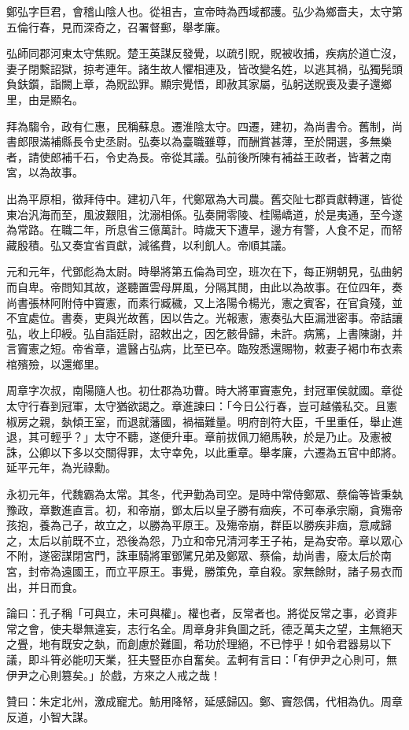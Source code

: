 \begin{pinyinscope}
鄭弘字巨君，會稽山陰人也。從祖吉，宣帝時為西域都護。弘少為鄉嗇夫，太守第五倫行春，見而深奇之，召署督郵，舉孝廉。

弘師同郡河東太守焦貺。楚王英謀反發覺，以疏引貺，貺被收捕，疾病於道亡沒，妻子閉繫詔獄，掠考連年。諸生故人懼相連及，皆改變名姓，以逃其禍，弘獨髡頭負鈇鑕，詣闕上章，為貺訟罪。顯宗覺悟，即赦其家屬，弘躬送貺喪及妻子還鄉里，由是顯名。

拜為騶令，政有仁惠，民稱蘇息。遷淮陰太守。四遷，建初，為尚書令。舊制，尚書郎限滿補縣長令史丞尉。弘奏以為臺職雖尊，而酬賞甚薄，至於開選，多無樂者，請使郎補千石，令史為長。帝從其議。弘前後所陳有補益王政者，皆著之南宮，以為故事。

出為平原相，徵拜侍中。建初八年，代鄭眾為大司農。舊交阯七郡貢獻轉運，皆從東冶汎海而至，風波艱阻，沈溺相係。弘奏開零陵、桂陽嶠道，於是夷通，至今遂為常路。在職二年，所息省三億萬計。時歲天下遭旱，邊方有警，人食不足，而帑藏殷積。弘又奏宜省貢獻，減徭費，以利飢人。帝順其議。

元和元年，代鄧彪為太尉。時舉將第五倫為司空，班次在下，每正朔朝見，弘曲躬而自卑。帝問知其故，遂聽置雲母屏風，分隔其閒，由此以為故事。在位四年，奏尚書張林阿附侍中竇憲，而素行臧穢，又上洛陽令楊光，憲之賓客，在官貪殘，並不宜處位。書奏，吏與光故舊，因以告之。光報憲，憲奏弘大臣漏泄密事。帝詰讓弘，收上印綬。弘自詣廷尉，詔敕出之，因乞骸骨歸，未許。病篤，上書陳謝，并言竇憲之短。帝省章，遣醫占弘病，比至已卒。臨歿悉還賜物，敕妻子褐巾布衣素棺殯殮，以還鄉里。

周章字次叔，南陽隨人也。初仕郡為功曹。時大將軍竇憲免，封冠軍侯就國。章從太守行春到冠軍，太守猶欲謁之。章進諫曰：「今日公行春，豈可越儀私交。且憲椒房之親，埶傾王室，而退就藩國，禍福難量。明府剖符大臣，千里重任，舉止進退，其可輕乎？」太守不聽，遂便升車。章前拔佩刀絕馬鞅，於是乃止。及憲被誅，公卿以下多以交關得罪，太守幸免，以此重章。舉孝廉，六遷為五官中郎將。延平元年，為光祿勳。

永初元年，代魏霸為太常。其冬，代尹勤為司空。是時中常侍鄭眾、蔡倫等皆秉埶豫政，章數進直言。初，和帝崩，鄧太后以皇子勝有痼疾，不可奉承宗廟，貪殤帝孩抱，養為己子，故立之，以勝為平原王。及殤帝崩，群臣以勝疾非痼，意咸歸之，太后以前既不立，恐後為怨，乃立和帝兄清河孝王子祐，是為安帝。章以眾心不附，遂密謀閉宮門，誅車騎將軍鄧騭兄弟及鄭眾、蔡倫，劫尚書，廢太后於南宮，封帝為遠國王，而立平原王。事覺，勝策免，章自殺。家無餘財，諸子易衣而出，并日而食。

論曰：孔子稱「可與立，未可與權」。權也者，反常者也。將從反常之事，必資非常之會，使夫舉無違妄，志行名全。周章身非負圖之託，德乏萬夫之望，主無絕天之舋，地有既安之埶，而創慮於難圖，希功於理絕，不已悖乎！如令君器易以下議，即斗筲必能叨天業，狂夫豎臣亦自奮矣。孟軻有言曰：「有伊尹之心則可，無伊尹之心則篡矣。」於戲，方來之人戒之哉！

贊曰：朱定北州，激成寵尤。魴用降帑，延感歸囚。鄭、竇怨偶，代相為仇。周章反道，小智大謀。


\end{pinyinscope}